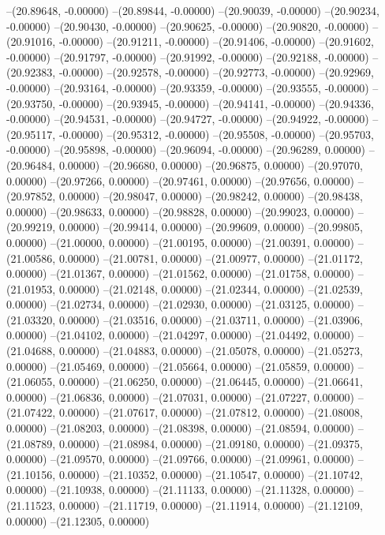 --(20.89648, -0.00000)
--(20.89844, -0.00000)
--(20.90039, -0.00000)
--(20.90234, -0.00000)
--(20.90430, -0.00000)
--(20.90625, -0.00000)
--(20.90820, -0.00000)
--(20.91016, -0.00000)
--(20.91211, -0.00000)
--(20.91406, -0.00000)
--(20.91602, -0.00000)
--(20.91797, -0.00000)
--(20.91992, -0.00000)
--(20.92188, -0.00000)
--(20.92383, -0.00000)
--(20.92578, -0.00000)
--(20.92773, -0.00000)
--(20.92969, -0.00000)
--(20.93164, -0.00000)
--(20.93359, -0.00000)
--(20.93555, -0.00000)
--(20.93750, -0.00000)
--(20.93945, -0.00000)
--(20.94141, -0.00000)
--(20.94336, -0.00000)
--(20.94531, -0.00000)
--(20.94727, -0.00000)
--(20.94922, -0.00000)
--(20.95117, -0.00000)
--(20.95312, -0.00000)
--(20.95508, -0.00000)
--(20.95703, -0.00000)
--(20.95898, -0.00000)
--(20.96094, -0.00000)
--(20.96289, 0.00000)
--(20.96484, 0.00000)
--(20.96680, 0.00000)
--(20.96875, 0.00000)
--(20.97070, 0.00000)
--(20.97266, 0.00000)
--(20.97461, 0.00000)
--(20.97656, 0.00000)
--(20.97852, 0.00000)
--(20.98047, 0.00000)
--(20.98242, 0.00000)
--(20.98438, 0.00000)
--(20.98633, 0.00000)
--(20.98828, 0.00000)
--(20.99023, 0.00000)
--(20.99219, 0.00000)
--(20.99414, 0.00000)
--(20.99609, 0.00000)
--(20.99805, 0.00000)
--(21.00000, 0.00000)
--(21.00195, 0.00000)
--(21.00391, 0.00000)
--(21.00586, 0.00000)
--(21.00781, 0.00000)
--(21.00977, 0.00000)
--(21.01172, 0.00000)
--(21.01367, 0.00000)
--(21.01562, 0.00000)
--(21.01758, 0.00000)
--(21.01953, 0.00000)
--(21.02148, 0.00000)
--(21.02344, 0.00000)
--(21.02539, 0.00000)
--(21.02734, 0.00000)
--(21.02930, 0.00000)
--(21.03125, 0.00000)
--(21.03320, 0.00000)
--(21.03516, 0.00000)
--(21.03711, 0.00000)
--(21.03906, 0.00000)
--(21.04102, 0.00000)
--(21.04297, 0.00000)
--(21.04492, 0.00000)
--(21.04688, 0.00000)
--(21.04883, 0.00000)
--(21.05078, 0.00000)
--(21.05273, 0.00000)
--(21.05469, 0.00000)
--(21.05664, 0.00000)
--(21.05859, 0.00000)
--(21.06055, 0.00000)
--(21.06250, 0.00000)
--(21.06445, 0.00000)
--(21.06641, 0.00000)
--(21.06836, 0.00000)
--(21.07031, 0.00000)
--(21.07227, 0.00000)
--(21.07422, 0.00000)
--(21.07617, 0.00000)
--(21.07812, 0.00000)
--(21.08008, 0.00000)
--(21.08203, 0.00000)
--(21.08398, 0.00000)
--(21.08594, 0.00000)
--(21.08789, 0.00000)
--(21.08984, 0.00000)
--(21.09180, 0.00000)
--(21.09375, 0.00000)
--(21.09570, 0.00000)
--(21.09766, 0.00000)
--(21.09961, 0.00000)
--(21.10156, 0.00000)
--(21.10352, 0.00000)
--(21.10547, 0.00000)
--(21.10742, 0.00000)
--(21.10938, 0.00000)
--(21.11133, 0.00000)
--(21.11328, 0.00000)
--(21.11523, 0.00000)
--(21.11719, 0.00000)
--(21.11914, 0.00000)
--(21.12109, 0.00000)
--(21.12305, 0.00000)
